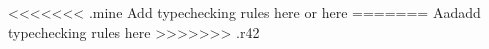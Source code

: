 <<<<<<< .mine
Add typechecking rules here
or here
=======
Aadadd typechecking rules here
>>>>>>> .r42
